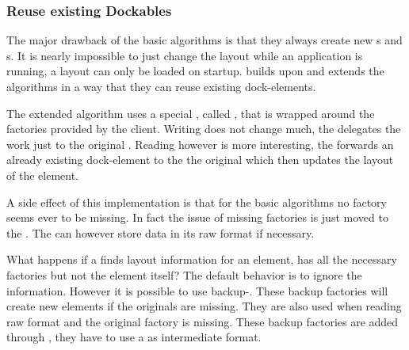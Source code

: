 \subsubsection{Reuse existing Dockables}
The major drawback of the basic algorithms is that they always create new s and s. It is nearly impossible to just change the layout while an application is running, a layout can only be loaded on startup.  builds upon  and extends the algorithms in a way that they can reuse existing dock-elements.

The extended algorithm uses a special , called , that is wrapped around the factories provided by the client. Writing does not change much, the  delegates the work just to the original . Reading however is more interesting, the  forwards an already existing dock-element to the the original  which then updates the layout of the element.

A side effect of this implementation is that for the basic algorithms no factory seems ever to be missing. In fact the issue of missing factories is just moved to the . The  can however store data in its raw format if necessary.


What happens if a  finds layout information for an element, has all the necessary factories but not the element itself? The default behavior is to ignore the information. However it is possible to use backup-. These backup factories will create new elements if the originals are missing. They are also used when reading raw format and the original factory is missing. These backup factories are added through , they have to use a  as intermediate format.


